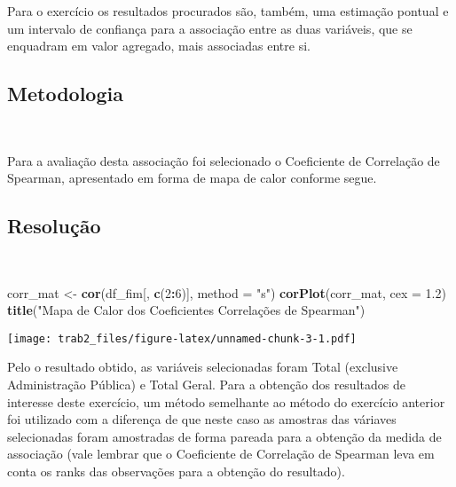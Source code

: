 \documentclass[11pt,]{article}
\newenvironment{Shaded}{\begin{snugshade}}{\end{snugshade}}
\newcommand{\DataTypeTok}[1]{\textcolor[rgb]{0.13,0.29,0.53}{#1}}
\newcommand{\DecValTok}[1]{\textcolor[rgb]{0.00,0.00,0.81}{#1}}
\newcommand{\FloatTok}[1]{\textcolor[rgb]{0.00,0.00,0.81}{#1}}
\newcommand{\KeywordTok}[1]{\textcolor[rgb]{0.13,0.29,0.53}{\textbf{#1}}}
\newcommand{\NormalTok}[1]{#1}
\newcommand{\OperatorTok}[1]{\textcolor[rgb]{0.81,0.36,0.00}{\textbf{#1}}}
\newcommand{\StringTok}[1]{\textcolor[rgb]{0.31,0.60,0.02}{#1}}
\begin{document}
Para o exercício os resultados procurados são, também, uma estimação
pontual e um intervalo de confiança para a associação entre as duas
variáveis, que se enquadram em valor agregado, mais associadas entre si.

\hypertarget{metodologia-1}{%
\subsection{Metodologia}\label{metodologia-1}}

~

Para a avaliação desta associação foi selecionado o Coeficiente de
Correlação de Spearman, apresentado em forma de mapa de calor conforme
segue.

\hypertarget{resoluuxe7uxe3o-1}{%
\subsection{Resolução}\label{resoluuxe7uxe3o-1}}

~

\begin{Shaded}
\begin{Highlighting}[]
\NormalTok{corr_mat <-}\StringTok{ }\KeywordTok{cor}\NormalTok{(df_fim[, }\KeywordTok{c}\NormalTok{(}\DecValTok{2}\OperatorTok{:}\DecValTok{6}\NormalTok{)], }\DataTypeTok{method =} \StringTok{"s"}\NormalTok{)}
\KeywordTok{corPlot}\NormalTok{(corr_mat, }\DataTypeTok{cex =} \FloatTok{1.2}\NormalTok{)}
\KeywordTok{title}\NormalTok{(}\StringTok{"Mapa de Calor dos Coeficientes Correlações de Spearman"}\NormalTok{)}
\end{Highlighting}
\end{Shaded}

\texttt{[image: trab2\_files/figure-latex/unnamed-chunk-3-1.pdf]}

Pelo o resultado obtido, as variáveis selecionadas foram Total
(exclusive Administração Pública) e Total Geral. Para a obtenção dos
resultados de interesse deste exercício, um método semelhante ao método
do exercício anterior foi utilizado com a diferença de que neste caso as
amostras das váriaves selecionadas foram amostradas de forma pareada
para a obtenção da medida de associação (vale lembrar que o Coeficiente
de Correlação de Spearman leva em conta os ranks das observações para a
obtenção do resultado).
\end{document}
